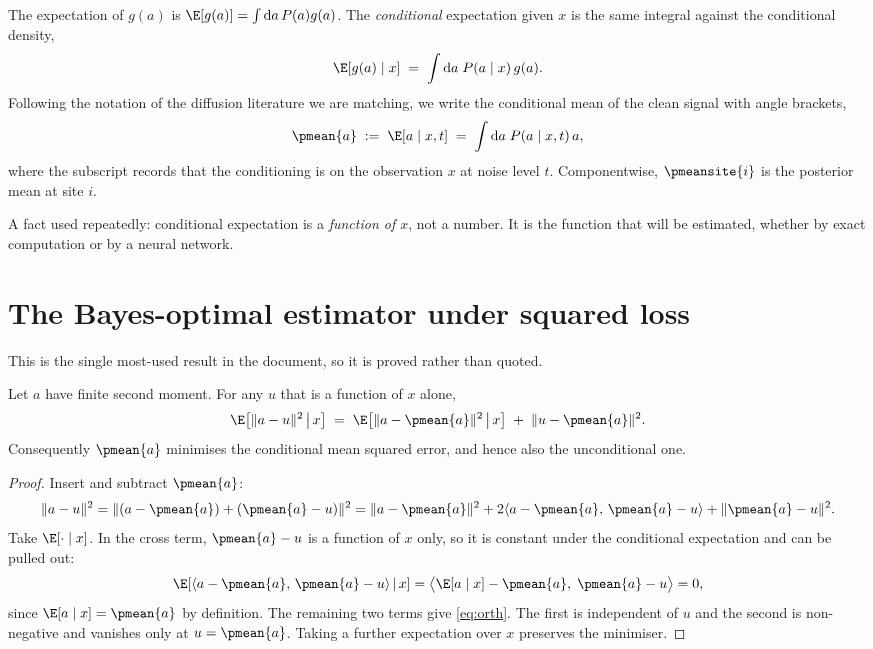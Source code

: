 The expectation of $g(a)$ is $\E[g(a)] = \int \mathrm{d}a\, P(a) g(a)$. The
\emph{conditional} expectation given $x$ is the same integral against the conditional density,
\begin{equation}
\E[g(a)\mid x] \;=\; \int \mathrm{d}a\; P(a\mid x)\, g(a).
\end{equation}
Following the notation of the diffusion literature we are matching, we write the conditional
mean of the clean signal with angle brackets,
\begin{equation}
\pmean{a} \;:=\; \E[a \mid x, t] \;=\; \int \mathrm{d}a\; P(a\mid x,t)\, a ,
\end{equation}
where the subscript records that the conditioning is on the observation $x$ at noise level
$t$. Componentwise, $\pmeansite{i}$ is the posterior mean at site $i$.

A fact used repeatedly: conditional expectation is a \emph{function of $x$}, not a number. It
is the function that will be estimated, whether by exact computation or by a neural network.

\section{The Bayes-optimal estimator under squared loss}
\label{sec:bayesopt}

This is the single most-used result in the document, so it is proved rather than quoted.

\begin{proposition}[Orthogonality]
\label{prop:orthogonality}
Let $a$ have finite second moment. For any $u$ that is a function of $x$ alone,
\begin{equation}
\label{eq:orth}
\E\!\left[\|a-u\|^2 \,\middle|\, x\right]
\;=\;
\E\!\left[\|a-\pmean{a}\|^2 \,\middle|\, x\right]
\;+\;
\|u-\pmean{a}\|^2 .
\end{equation}
Consequently $\pmean{a}$ minimises the conditional mean squared error, and hence also the
unconditional one.
\end{proposition}

\begin{proof}
Insert and subtract $\pmean{a}$:
\[
\|a-u\|^2 = \|(a - \pmean{a}) + (\pmean{a} - u)\|^2
= \|a-\pmean{a}\|^2 + 2\langle a - \pmean{a},\, \pmean{a}-u\rangle + \|\pmean{a}-u\|^2 .
\]
Take $\E[\cdot\mid x]$. In the cross term, $\pmean{a}-u$ is a function of $x$ only, so it is
constant under the conditional expectation and can be pulled out:
\[
\E\!\left[\langle a - \pmean{a},\, \pmean{a}-u\rangle \,\middle|\, x\right]
= \big\langle \E[a\mid x] - \pmean{a},\; \pmean{a}-u \big\rangle = 0 ,
\]
since $\E[a\mid x] = \pmean{a}$ by definition. The remaining two terms give \eqref{eq:orth}.
The first is independent of $u$ and the second is non-negative and vanishes only at
$u = \pmean{a}$. Taking a further expectation over $x$ preserves the minimiser.
\end{proof}

